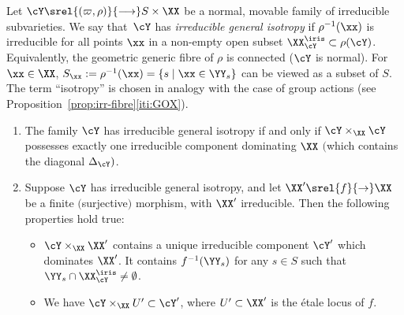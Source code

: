 \begin{m-definition}\label{def:irr-fibre}
Let $\cY\srel{(\varpi,\rho)}{\longrightarrow}S\times\XX$ be a normal, movable family of irreducible subvarieties. We say that~$\cY$ has {\em irreducible general isotropy} if  $\rho^{-1}(\xx)$ is irreducible for all points $\xx$ in a non-empty open subset $\XX^\iris_\cY\subset\rho(\cY)$. Equivalently, the geometric generic fibre of $\rho$ is connected ($\cY$ is normal). 
For $\xx\in\XX$, $S_\xx:=\rho^{-1}(\xx)=\{ s\mid \xx\in\YY_s \}$ can be viewed as a subset of $S$. The term ``isotropy'' is chosen in analogy with the case of group actions (see Proposition~\ref{prop:irr-fibre}\ref{iti:GOX}). 
\end{m-definition}

\begin{m-lemma}\label{lm:irr-fibre}\leavevmode
\begin{enumerate}
\item \label{l:if-1}
The family $\cY$ has irreducible general isotropy if and only if  $\cY\times_\XX\cY$ possesses exactly one irreducible component dominating $\XX$ $($which contains the diagonal $\Delta_\cY)$.
\item \label{l:if-2}
Suppose $\cY$ has irreducible general isotropy, and let $\XX'\srel{f}{\to}\XX$ be a finite $($surjective$)$ morphism, with $\XX'$ irreducible. Then the following properties hold true: 
\begin{itemize}
\item $\cY\times_\XX\XX'$ contains a unique irreducible component $\cY'$ which dominates $\XX'$. It contains $f^{-1}(\YY_s)$ for any $s\in S$ such that $\YY_s\cap\XX^\iris_\cY\neq\emptyset$.
\item We have $\cY\times_\XX U'\subset\cY'$, where $U'\subset\XX'$ is the \'etale locus of $f$. 
\end{itemize}
\end{enumerate}
\end{m-lemma}

